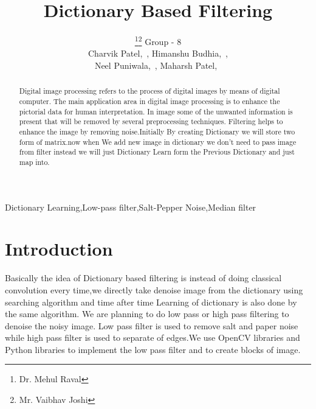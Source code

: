 \documentclass[journal]{IEEEtran}
\begin{document}
	\title{Dictionary Based Filtering}
	
	\author{\thanks{Dr. Mehul Raval}\thanks{Mr. Vaibhav Joshi} 
		Group - 8\\
		Charvik Patel,~,
		Himanshu Budhia,~,\\
		Neel Puniwala,~, 
		Maharsh Patel,~}
	
	
	
	
	\maketitle
	
	
	\begin{abstract}
		Digital image processing refers to the process of digital
		images by means of digital computer. The main application
		area in digital image processing is to enhance the pictorial
		data for human interpretation. In image some of
		the unwanted information is present that will be removed by
		several preprocessing techniques. Filtering helps to enhance
		the image by removing noise.Initially By creating Dictionary we will store two form of matrix.now when We add new image in dictionary we don't need to pass image from filter instead we will just Dictionary Learn form the Previous Dictionary and just map into.
		
	\end{abstract}
	\begin{IEEEkeywords}
		Dictionary Learning,Low-pass filter,Salt-Pepper Noise,Median filter
	\end{IEEEkeywords}
	
	
	\IEEEpeerreviewmaketitle
	
	
	
	\section{\textbf{Introduction}}
	Basically the idea of Dictionary based filtering is instead of doing classical convolution every time,we directly take de\textendash noise image from the dictionary using searching algorithm and time after time Learning of dictionary is also done by the same algorithm. We are planning to do low pass or high pass filtering to de\textendash noise the noisy image. Low pass filter is used to remove salt and paper noise while high pass filter is used to separate of edges.We use OpenCV libraries and Python libraries to implement the low pass filter and to create blocks of image.
	
\end{document}
